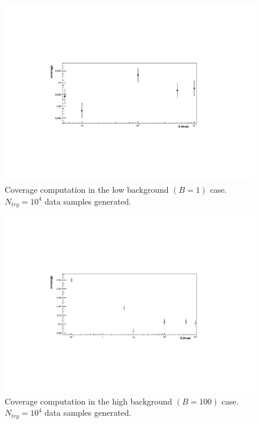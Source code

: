 \documentclass[10pt, oneside]{article}   	%
\begin{document}
\begin{figure}[h]
    \centering
    \includegraphics[width=\textwidth]{Ex1_b1.pdf}
    \caption{Coverage computation in the low background $(B = 1)$ case. $N_{try} = 10^4$ data samples generated.}
    \label{fig:cov_b1}
\end{figure}

\begin{figure}[h]
    \centering
    \includegraphics[width=\textwidth]{Ex1_b100.pdf}
    \caption{Coverage computation in the high background $(B = 100)$ case. $N_{try} = 10^4$ data samples generated.}
    \label{fig:cov_b100}
\end{figure}
\end{document}
